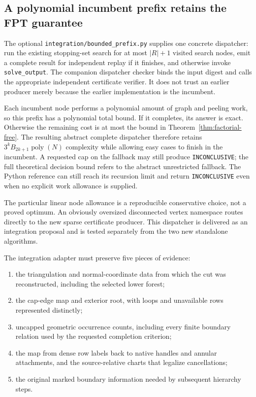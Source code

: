 \subsection{A polynomial incumbent prefix retains the FPT guarantee}
\label{sec:bounded-prefix}

The optional \texttt{integration/bounded\_prefix.py} supplies one concrete
dispatcher: run the existing stopping-set search for at most $|R|+1$
visited search nodes, emit a complete result for independent replay if it finishes,
and otherwise invoke \texttt{solve\_output}. The companion dispatcher
checker binds the input digest and calls the appropriate independent
certificate verifier. It does not trust an earlier producer merely
because the earlier implementation is the incumbent.

Each incumbent node performs a polynomial amount of graph and peeling
work, so this prefix has a polynomial total bound. If it completes, its
answer is exact. Otherwise the remaining cost is at most the bound in
Theorem~\ref{thm:factorial-free}. The resulting abstract complete dispatcher therefore
retains $3^kB_{2k+1}\operatorname{poly}(N)$ complexity while allowing easy
cases to finish in the incumbent. A requested cap on the fallback may
still produce \texttt{INCONCLUSIVE}; the full theoretical decision bound
refers to the abstract unrestricted fallback. The Python reference can
still reach its recursion limit and return \texttt{INCONCLUSIVE} even when
no explicit work allowance is supplied.

The particular linear node allowance is a reproducible conservative
choice, not a proved optimum. An obviously oversized disconnected vertex
namespace routes directly to the new sparse certificate producer. This dispatcher is delivered as an integration proposal and
is tested separately from the two new standalone algorithms.

The integration adapter must preserve five pieces of evidence:
\begin{enumerate}
\item the triangulation and normal-coordinate data from which the cut was
reconstructed, including the selected lower forest;
\item the cap-edge map and exterior root, with loops and unavailable rows
represented distinctly;
\item uncapped geometric occurrence counts, including every finite boundary
relation used by the requested completion criterion;
\item the map from dense row labels back to native handles and annular
attachments, and the source-relative charts that legalize cancellations;
\item the original marked boundary information needed by subsequent
hierarchy steps.
\end{enumerate}


